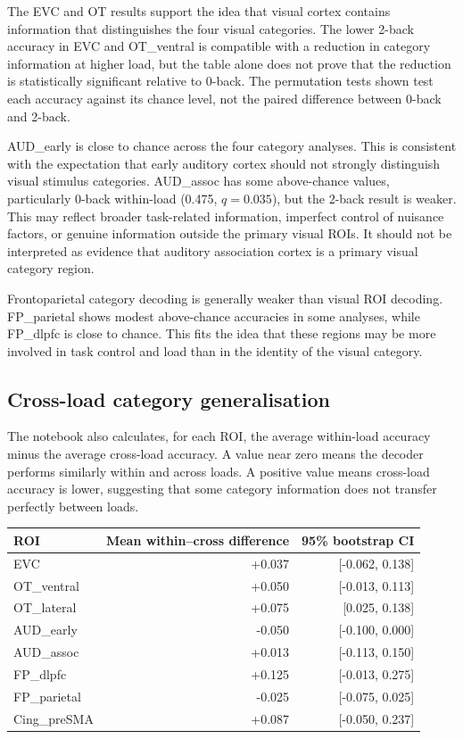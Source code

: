 \documentclass[11pt,a4paper]{article}
\begin{document}
The EVC and OT results support the idea that visual cortex contains information that distinguishes the four visual categories. The lower 2-back accuracy in EVC and OT\_ventral is compatible with a reduction in category information at higher load, but the table alone does not prove that the reduction is statistically significant relative to 0-back. The permutation tests shown test each accuracy against its chance level, not the paired difference between 0-back and 2-back.

AUD\_early is close to chance across the four category analyses. This is consistent with the expectation that early auditory cortex should not strongly distinguish visual stimulus categories. AUD\_assoc has some above-chance values, particularly 0-back within-load (0.475, \(q=0.035\)), but the 2-back result is weaker. This may reflect broader task-related information, imperfect control of nuisance factors, or genuine information outside the primary visual ROIs. It should not be interpreted as evidence that auditory association cortex is a primary visual category region.

Frontoparietal category decoding is generally weaker than visual ROI decoding. FP\_parietal shows modest above-chance accuracies in some analyses, while FP\_dlpfc is close to chance. This fits the idea that these regions may be more involved in task control and load than in the identity of the visual category.

\subsection{Cross-load category generalisation}

The notebook also calculates, for each ROI, the average within-load accuracy minus the average cross-load accuracy. A value near zero means the decoder performs similarly within and across loads. A positive value means cross-load accuracy is lower, suggesting that some category information does not transfer perfectly between loads.

\begin{center}
\begin{tabular}{lrr}
\toprule
\textbf{ROI} & \textbf{Mean within--cross difference} & \textbf{95\% bootstrap CI}\\
\midrule
EVC & +0.037 & [-0.062, 0.138]\\
OT\_ventral & +0.050 & [-0.013, 0.113]\\
OT\_lateral & +0.075 & [0.025, 0.138]\\
AUD\_early & -0.050 & [-0.100, 0.000]\\
AUD\_assoc & +0.013 & [-0.113, 0.150]\\
FP\_dlpfc & +0.125 & [-0.013, 0.275]\\
FP\_parietal & -0.025 & [-0.075, 0.025]\\
Cing\_preSMA & +0.087 & [-0.050, 0.237]\\
\bottomrule
\end{tabular}
\end{center}
\end{document}
